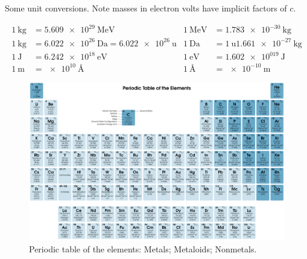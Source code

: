 \begin{table}[htb]
    \caption[Unit conversions.]{Some unit conversions. Note masses in electron volts have implicit factors of \(c\).}
    \begin{align*}
        \qty{1}{\kilogram} &= \qty{5.609e29}{\mega\electronvolt} & \qty{1}{\mega\electronvolt} &= \qty{1.783e-30}{\kilogram}\\
        \qty{1}{\kilogram} &= \qty{6.022e26}{\dalton} = \qty{6.022e26}{\atomicmassunit} & \qty{1}{\dalton} &= \qty{1}{\atomicmassunit} \qty{1.661e-27}{\kilogram}\\
        \qty{1}{\joule} &= \qty{6.242e18}{\electronvolt} & \qty{1}{\electronvolt} &= \qty{1.602e019}{\joule}\\
        \qty{1}{\metre} &= \qty{e10}{\angstrom} & \qty{1}{\angstrom} &= \qty{e-10}{\metre}
    \end{align*}
\end{table}

\begin{figure}
    \centering
    \includegraphics[height=\textwidth, angle=90]{images/periodic-table/periodic-table.pdf}
    \tikzexternaldisable
    \caption[Periodic table.]{Periodic table of the elements: \protect{} Metals; \protect{} Metaloids; \protect{} Nonmetals.}
    \tikzexternalenable
\end{figure}